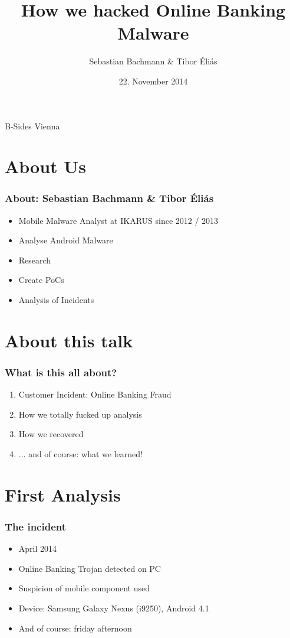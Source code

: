\documentclass[12pt,a4paper]{beamer}
\author{Sebastian Bachmann \& Tibor Éliás}
\title{How we hacked Online Banking Malware}
\date{22. November 2014}
\begin{document}
\begin{frame}
    \maketitle
    \centering
    B-Sides Vienna
\end{frame}


\section{About Us}
\begin{frame}
	\frametitle{About: Sebastian Bachmann \& Tibor Éliás}
	\begin{itemize}
		\item Mobile Malware Analyst at IKARUS since 2012 / 2013
		\item Analyse Android Malware
		\item Research
		\item Create PoCs
		\item Analysis of Incidents
	\end{itemize}
\end{frame}

\section{About this talk}
\begin{frame}
	\frametitle{What is this all about?}
	\begin{enumerate}
	
		\item Customer Incident: Online Banking Fraud
		\item How we totally fucked up analysis
		\item How we recovered
		\item ... and of course: what we learned!
	\end{enumerate}
\end{frame}


\section{First Analysis}

\begin{frame}
	\frametitle{The incident}
	
	\begin{itemize}
		\item April 2014
		\item Online Banking Trojan detected on PC
		\item Suspicion of mobile component used
		\item Device: Samsung Galaxy Nexus (i9250), Android 4.1
		\item And of course: friday afternoon
	\end{itemize}

\end{frame}
\end{document}

